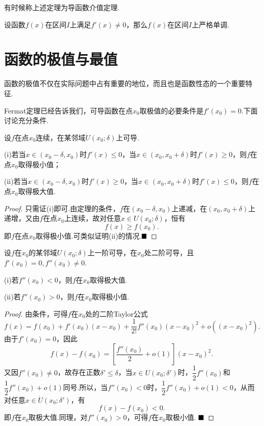 \begin{remark}
	有时候称上述定理为{\heiti 导函数介值定理}.
\end{remark}
\begin{corollary}
	设函数$f(x)$在区间$I$上满足$f'(x)\neq 0$，那么$f(x)$在区间$I$上严格单调.
\end{corollary}
\section{函数的极值与最值}
函数的极值不仅在实际问题中占有重要的地位，而且也是函数性态的一个重要特征.

Fermat定理已经告诉我们，可导函数在点$x_0$取极值的必要条件是$f'(x_0)=0$.下面讨论充分条件.
\begin{theorem}[极值的第一充分条件]
	设$f$在点$x_0$连续，在某邻域$\mathring{U}(x_0;\delta)$上可导.
	
	(i)若当$x\in(x_0-\delta,x_0)$时$f'(x)\leqslant 0$，当$x\in (x_0,x_0+\delta)$时$f'(x)\geqslant 0$，则$f$在点$x_0$取得极小值；
	
	(ii)若当$x\in(x_0-\delta,x_0)$时$f'(x)\geqslant 0$，当$x\in (x_0,x_0+\delta)$时$f'(x)\leqslant 0$，则$f$在点$x_0$取得极大值.
\end{theorem}
\begin{proof}
	只需证(i)即可.由定理的条件，$f$在$(x_0-\delta,x_0)$上递减，在$(x_0,x_0+\delta)$上递增，又由$f$在点$x_0$上连续，故对任意$x\in U(x_0;\delta)$，恒有
	$$f(x)\geqslant f(x_0).$$
	即$f$在点$x_0$取得极小值.可类似证明(ii)的情况.$\hfill\blacksquare$
\end{proof}
\begin{theorem}[极值的第二充分条件]
	设$f$在$x_0$的某邻域$U(x_0;\delta)$上一阶可导，在$x_0$处二阶可导，且$f'(x_0)=0,f''(x_0)\neq 0$.
	
	(i)若$f''(x_0)<0$，则$f$在$x_0$取得极大值.
	
	(ii)若$f''(x_0)>0$，则$f$在$x_0$取得极小值.
\end{theorem}
\begin{proof}
	由条件，可得$f$在$x_0$处的二阶Taylor公式
	$$f(x)=f(x_0)+f'(x_0)(x-x_0)+\frac{1}{2!}f''(x_0)(x-x_0)^2+o((x-x_0)^2).$$
	由于$f'(x_0)=0$，因此
	$$f(x)-f(x_0)=\left[\frac{f''(x_0)}{2}+o(1)\right](x-x_0)^2.$$
	又因$f''(x_0)\neq 0$，故存在正数$\delta'\leqslant\delta$，当$x\in U(x_0;\delta')$时，$\dfrac{1}{2}f''(x_0)$和$\dfrac{1}{2}f''(x_0)+o(1)$同号.所以，当$f''(x_0)<0$时，$\dfrac{1}{2}f''(x_0)+o(1)<0$，从而对任意$x\in \mathring{U}(x_0;\delta')$，有
	$$f(x)-f(x_0)<0.$$
	即$f$在$x_0$取极大值.同理，对$f''(x_0)>0$，可得$f$在$x_0$取极小值.
	$\hfill\blacksquare$
\end{proof}

